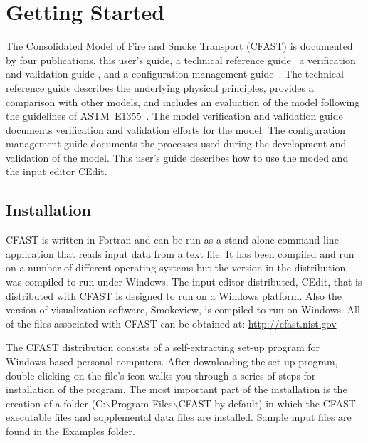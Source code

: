 
\chapter{Getting Started}

The Consolidated Model of Fire and Smoke Transport (CFAST) is documented by four publications, this user's guide, a technical reference guide~\cite{CFAST_Tech_Guide_7} a verification and validation guide \cite{CFAST_Valid_Guide_7}, and a configuration management guide~\cite{CFAST_Config_Guide_7}. The technical reference guide describes the underlying physical principles, provides a comparison with other models, and includes an evaluation of the model following the guidelines of ASTM~E1355~\cite{ASTM:E1355}. The model verification and validation guide documents verification and validation efforts for the model. The configuration management guide documents the processes used during the development and validation of the model. This user's guide describes how to use the moded and the input editor CEdit.

\section{Installation}
CFAST is written in Fortran and can be run as a stand alone command line application that reads input data from a text file. It has been compiled and run on a number of different operating systems but the version in the distribution was compiled to run under Windows. The input editor distributed, CEdit, that is distributed with CFAST is designed to run on a Windows platform. Also the version of visualization software, Smokeview, is compiled to run on Windows. All of the files associated with CFAST can be obtained at: \url{http://cfast.nist.gov}

The CFAST distribution consists of a self-extracting set-up program for Windows-based personal computers. After downloading the set-up program, double-clicking on the file's icon walks you through a series of steps for installation of the program.  The most important part of the installation is the creation of a folder ({\ct C:$\backslash$Program Files$\backslash$CFAST} by default) in which the CFAST executable files and supplemental data files are installed.  Sample input files are found in the {\ct Examples} folder.

